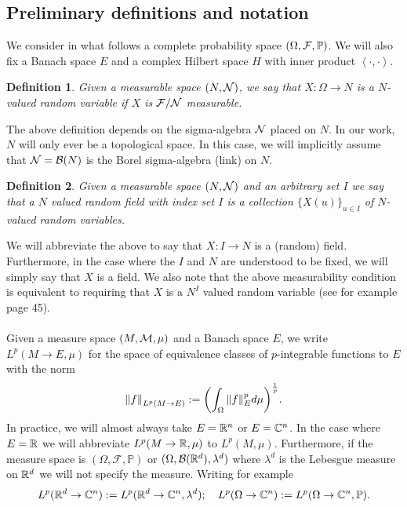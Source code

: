 \documentclass[12pt]{article}
\newtheorem{definition}{Definition}
\newcommand{\br}[1]{\left\langle#1\right\rangle}
\begin{document}
\subsection{Preliminary definitions and notation}
We consider in what follows a complete probability space $(\Omega,\mathcal{F},\mathbb{P})$. We will also fix a Banach space $E$ and a complex Hilbert space $H$ with inner product $\br{\cdot,\cdot}$.
\begin{definition}
    Given a measurable space $(N,\mathcal{N})$, we say that $X:\Omega\to N$ is a \emph{$N$-valued random variable} if  $X$ is  $\mathcal{F}/\mathcal{N}$  measurable.
\end{definition}
The above definition depends on the sigma-algebra $\mathcal{N}$ placed on $N$. In our work, $N$ will only ever be a topological space. In this case, we will implicitly assume that $\mathcal{N}=\mathcal{B}(N)$ is the Borel sigma-algebra (link) on $N$.
\begin{definition}
    Given a measurable space $(N,\mathcal{N})$ and an arbitrary set $I$  we say that a \emph{$N$ valued random field with index set $I$} is a collection $\{X(u)\}_{u\in I} $ of $N$-valued random variables.
\end{definition}
We will abbreviate the above to say that $X: I\to N$ is a (random) field. Furthermore, in the case where the $I$ and  $N$ are understood to be fixed, we will simply say that $X$ is a field. We also note that the above measurability condition is equivalent to requiring that $X$ is a  $N^I$ valued random variable (see for example \cite{ccinlar2011probability} page 45).
\\
\\
Given a measure space $(M,\mathcal{M},\mu )$ and a Banach space $E$, we write\\
$L^p(M\to E,\mu)$ for the space of equivalence classes of $p$-integrable functions to  $E$ with the norm
\begin{equation*}
    \norm{f}_{L^p(M\to E)}:=\qty(\int_{\Omega}\norm{f}^p_E d\mu)^\frac{1}{p}.
\end{equation*}
In practice, we will almost always take $E={\mathbb R}^n$ or $E=\mathbb{C}^n$. In the case where $E={\mathbb R}$ we will abbreviate $L^p(M\to{\mathbb R},\mu)$ to $L^p(M,\mu)$. Furthermore, if the measure space is $(\Omega,\mathcal{F},\mathbb{P})$ or $(\Omega,\mathcal{B}({\mathbb R}^d),\lambda^d)$ where $\lambda^d$ is the Lebesgue measure on ${\mathbb R}^d$ we will not specify the measure. Writing for example
\begin{equation*}
    L^p({\mathbb R}^d\to\mathbb{C}^n):=L^p({\mathbb R}^d\to\mathbb{C}^n,\lambda^d);\quad L^p(\Omega\to\mathbb{C}^n):=L^p(\Omega\to\mathbb{C}^n,\mathbb{P}).
\end{equation*}
\end{document}
